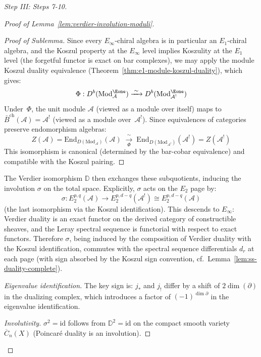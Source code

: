 \begin{proof}[Step III: Steps 7-10]
\begin{proof}[Proof of Lemma~\ref{lem:verdier-involution-moduli}]
\begin{proof}[Proof of Sublemma]
Since every $E_\infty$-chiral algebra is in particular an $E_1$-chiral algebra, and the Koszul property at the $E_\infty$ level implies Koszulity at the $E_1$ level (the forgetful functor is exact on bar complexes), we may apply the module Koszul duality equivalence
(Theorem~\ref{thm:e1-module-koszul-duality}), which gives:
\begin{equation}
\Phi: D^b(\mathrm{Mod}^{\Eone}_{\mathcal{A}}) \xrightarrow{\;\sim\;}
D^b(\mathrm{Mod}^{\Eone}_{\mathcal{A}^!})
\end{equation}
Under~$\Phi$, the unit module $\mathcal{A}$ (viewed as a module over itself)
maps to $\bar{B}^{\mathrm{ch}}(\mathcal{A}) = \mathcal{A}^!$ (viewed as a
module over~$\mathcal{A}^!$).  Since equivalences of categories preserve
endomorphism algebras:
\begin{equation}
Z(\mathcal{A}) = \mathrm{End}_{D(\mathrm{Mod}_{\mathcal{A}})}(\mathcal{A})
\;\xrightarrow[\Phi]{\;\sim\;}\;
\mathrm{End}_{D(\mathrm{Mod}_{\mathcal{A}^!})}(\mathcal{A}^!)
= Z(\mathcal{A}^!)
\end{equation}
This isomorphism is canonical (determined by the bar-cobar equivalence) and
compatible with the Koszul pairing.
\end{proof}

The Verdier isomorphism
$\mathbb{D}$ then exchanges these subquotients, inducing the involution
$\sigma$ on the total space.  Explicitly, $\sigma$ acts on the $E_2$ page by:
\begin{equation}
\sigma: E_2^{p,q}(\mathcal{A}) \to E_2^{p,d-q}(\mathcal{A}^!) \cong
E_2^{p,d-q}(\mathcal{A})
\end{equation}
(the last isomorphism via the Koszul identification).  This descends to $E_\infty$:
Verdier duality is an exact functor on the derived category of constructible sheaves,
and the Leray spectral sequence is functorial with respect to exact functors.
Therefore $\sigma$, being induced by the composition of Verdier duality with the
Koszul identification, commutes with the spectral sequence differentials $d_r$
at each page (with sign absorbed by the Koszul sign convention, cf.\
Lemma~\ref{lem:ss-duality-complete}).

\emph{Eigenvalue identification.}
The key sign is: $j_*$ and $j_!$ differ by a shift of $2\dim(\partial)$ in the
dualizing complex, which introduces a factor of $(-1)^{\dim \partial}$ in the
eigenvalue identification.

\emph{Involutivity.}  $\sigma^2 = \mathrm{id}$ follows from
$\mathbb{D}^2 = \mathrm{id}$ on the compact smooth variety $\overline{C}_n(X)$
(Poincar\'e duality is an involution).
\end{proof}


\end{proof}
